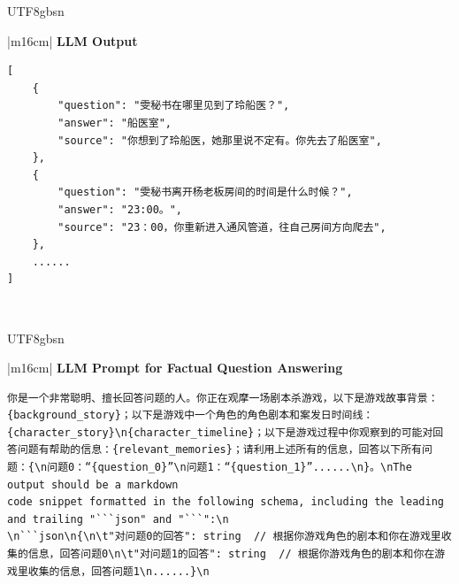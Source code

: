 \documentclass[11pt]{article}
\begin{document}
{\begin{CJK}{UTF8}{gbsn}
\begin{table}[ht!]
\begin{tabular}{|m{16cm}|}
\hline
{}  \textbf{LLM Output}  \\
\hline
\begin{minipage}[t]{\linewidth}
\small\begin{verbatim}
[
    {
        "question": "雯秘书在哪里见到了玲船医？",
        "answer": "船医室",
        "source": "你想到了玲船医，她那里说不定有。你先去了船医室",
    },
    {
        "question": "雯秘书离开杨老板房间的时间是什么时候？",
        "answer": "23:00。",
        "source": "23：00，你重新进入通风管道，往自己房间方向爬去",
    },
    ......
]

\end{verbatim}
\end{minipage} \\
\hline
\end{tabular}
\caption{LLM prompts and outputs for factual question generation.}
\label{table:prompt_factual_ques_generation_cn}
\end{table}
\end{CJK}




\begin{CJK}{UTF8}{gbsn}
\begin{table}[ht!]
\centering
\begin{tabular}{|m{16cm}|}
\hline
{}  {\textbf{LLM Prompt for Factual Question Answering}} \\
\begin{minipage}[t]{\linewidth}
\small\begin{verbatim}
你是一个非常聪明、擅长回答问题的人。你正在观摩一场剧本杀游戏，以下是游戏故事背景：{background_story}；以下是游戏中一个角色的角色剧本和案发日时间线：{character_story}\n{character_timeline}；以下是游戏过程中你观察到的可能对回答问题有帮助的信息：{relevant_memories}；请利用上述所有的信息，回答以下所有问题：{\n问题0：“{question_0}”\n问题1：“{question_1}”......\n}。\nThe output should be a markdown
code snippet formatted in the following schema, including the leading and trailing "```json" and "```":\n
\n```json\n{\n\t"对问题0的回答": string  // 根据你游戏角色的剧本和你在游戏里收集的信息，回答问题0\n\t"对问题1的回答": string  // 根据你游戏角色的剧本和你在游戏里收集的信息，回答问题1\n......}\n


\end{verbatim}
\end{minipage}
\end{tabular}
\end{table}
\end{CJK}}
\end{document}
